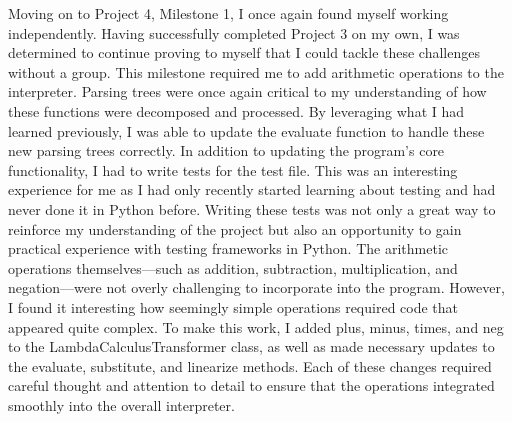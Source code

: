 \documentclass{article}
\theoremstyle{plain}
\theoremstyle{definition}
\theoremstyle{remark}
\begin{document}
Moving on to Project 4, Milestone 1, I once again found myself working independently. Having successfully completed Project 3 on my own, I was determined to continue proving to myself that I could tackle these challenges without a group. This milestone required me to add arithmetic operations to the interpreter. Parsing trees were once again critical to my understanding of how these functions were decomposed and processed. By leveraging what I had learned previously, I was able to update the evaluate function to handle these new parsing trees correctly. In addition to updating the program's core functionality, I had to write tests for the test file. This was an interesting experience for me as I had only recently started learning about testing and had never done it in Python before. Writing these tests was not only a great way to reinforce my understanding of the project but also an opportunity to gain practical experience with testing frameworks in Python. The arithmetic operations themselves—such as addition, subtraction, multiplication, and negation—were not overly challenging to incorporate into the program. However, I found it interesting how seemingly simple operations required code that appeared quite complex. To make this work, I added plus, minus, times, and neg to the LambdaCalculusTransformer class, as well as made necessary updates to the evaluate, substitute, and linearize methods. Each of these changes required careful thought and attention to detail to ensure that the operations integrated smoothly into the overall interpreter. 
\end{document}
